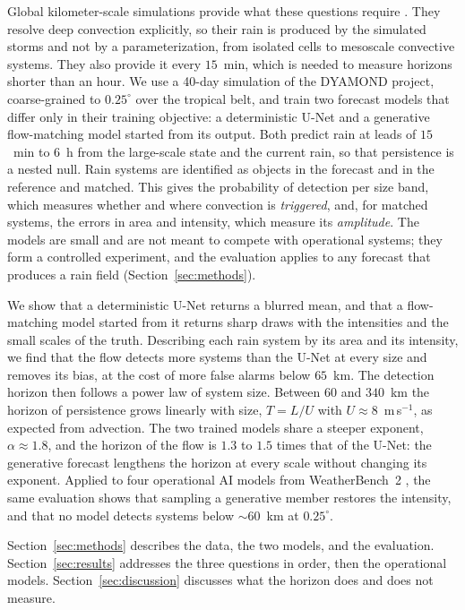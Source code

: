 \documentclass[draft]{agujournal2019}
\begin{document}
Global kilometer-scale simulations provide what these questions require
\cite{stevens2019, satoh2019}. They resolve deep convection explicitly, so
their rain is produced by the simulated storms and not by a
parameterization, from isolated cells to mesoscale convective systems. They
also provide it every $15$~min, which is needed to measure horizons shorter
than an hour. We use a 40-day simulation of the DYAMOND project,
coarse-grained to $0.25^{\circ}$ over the tropical belt, and train two
forecast models that differ only in their training objective: a
deterministic U-Net and a generative flow-matching model started from its
output. Both predict rain at leads of $15$~min to $6$~h from the
large-scale state and the current rain, so that persistence is a nested
null. Rain systems are identified as objects in the forecast and in the
reference and matched. This gives the probability of detection per size
band, which measures whether and where convection is \emph{triggered}, and,
for matched systems, the errors in area and intensity, which measure its
\emph{amplitude}. The models are small and are not meant to compete with
operational systems; they form a controlled experiment, and the evaluation
applies to any forecast that produces a rain field
(Section~\ref{sec:methods}).

We show that a deterministic U-Net returns a blurred mean, and that a
flow-matching model started from it returns sharp draws with the
intensities and the small scales of the truth. Describing each rain system
by its area and its intensity, we find that the flow detects more systems
than the U-Net at every size and removes its bias, at the cost of more
false alarms below $65$~km. The detection horizon then follows a power law
of system size. Between $60$ and $340$~km the horizon of persistence grows
linearly with size, $T = L/U$ with $U \approx 8$~m\,s$^{-1}$, as expected
from advection. The two trained models share a steeper exponent,
$\alpha \approx 1.8$, and the horizon of the flow is $1.3$ to $1.5$ times
that of the U-Net: the generative forecast lengthens the horizon at every
scale without changing its exponent. Applied to four operational AI models
from WeatherBench~2
\cite{lam2023, chen2023, price2025, alet2025, rasp2024}, the same
evaluation shows that sampling a generative member restores the intensity,
and that no model detects systems below ${\sim}60$~km at $0.25^{\circ}$.

Section~\ref{sec:methods} describes the data, the two models, and the
evaluation. Section~\ref{sec:results} addresses the three questions in
order, then the operational models. Section~\ref{sec:discussion}
discusses what the horizon does and does not measure.
\end{document}

